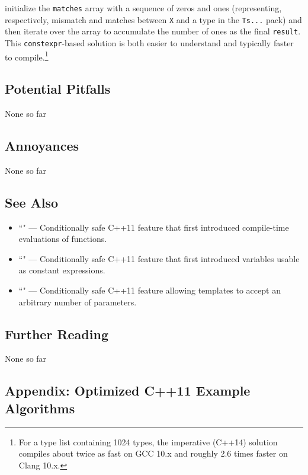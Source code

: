 initialize the \texttt{matches} array with a sequence of zeros and ones
(representing, respectively, mismatch and matches between \texttt{X} and
a type in the \texttt{Ts...} pack) and then iterate over the array to
accumulate the number of ones as the final \texttt{result}. This
\texttt{constexpr}-based solution is both easier to understand and
typically faster to compile.{\cprotect\footnote{For a type list
containing 1024 types, the imperative (C++14) solution compiles about
twice as fast on GCC 10.x and roughly 2.6 times faster on Clang
  10.x.}}

\subsection[Potential Pitfalls]{Potential Pitfalls}\label{potential-pitfalls}

None so far

\subsection[Annoyances]{Annoyances}\label{annoyances}

None so far

\subsection[See Also]{See Also}\label{see-also}

\begin{itemize}
\item{``" — Conditionally safe C++11 feature that first introduced compile-time evaluations of functions.}
\item{``" — Conditionally safe C++11 feature that first introduced variables usable as constant expressions.}
\item{``" — Conditionally safe C++11 feature allowing templates to accept an arbitrary number of parameters.}
\end{itemize}

\subsection[Further Reading]{Further Reading}\label{further-reading}

None so far

\subsection[Appendix: Optimized C++11 Example Algorithms]{Appendix: Optimized C++11 Example Algorithms}\label{appendix:-optimized-c++11-example-algorithms}

